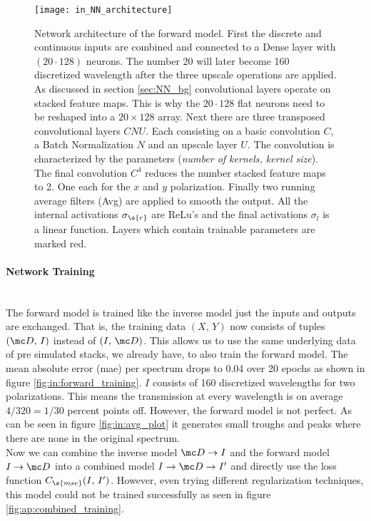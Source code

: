 \begin{figure}[H]
    \centering
    \texttt{[image: in\_NN\_architecture]}
    \caption{Network architecture of the forward model. First the discrete and continuous inputs are combined and connected to a Dense layer with 
    $(20 \cdot 128)$
    neurons. The number 20 will later become 160 discretized wavelength after the three upscale operations are applied. As discussed in section \ref{sec:NN_bg} convolutional layers operate on stacked feature maps. This is why the $20 \cdot 128$ flat neurons need to be reshaped into a $20 \times 128$ array. Next there are three transposed convolutional layers $CNU$. Each consisting on a basic convolution $C$, a Batch Normalization $N$ and an upscale layer $U$. The convolution is characterized by the parameters (\textit{number of kernels, kernel size}). The final convolution $C^4$ reduces the number stacked feature maps to 2. One each for the $x$ and $y$ polarization. Finally two running average filters (Avg) are applied to smooth the output. All the internal activations $\sigma_\s{r}$ are ReLu's and the final activations $\sigma_{l}$ is a linear function.
    Layers which contain trainable parameters are marked red.
    }
    \label{fig:in:NN}
\end{figure}



\newpage
\paragraph{Network Training}~\\
The forward model is trained like the inverse model just the inputs and outputs are exchanged. That is, the training data $(X,\, Y)$ now consists of tuples 
$(\mc D,\, I)$ instead of $(I,\, \mc D)$.
This allows us to use the same underlying data of pre simulated stacks, we already have, to also train the forward model. 
The mean absolute error (mae) per spectrum drops to 0.04 over 20 epochs as shown in figure \ref{fig:in:forward_training}. $I$ consists of 160 discretized wavelengths for two polarizations. This means the transmission at every wavelength is on average $4/320 = 1/30$ percent points off. However, the forward model is not perfect. As can be seen in figure \ref{fig:in:avg_plot} it generates small troughs and peaks where there are none in the original spectrum.
\\

\indent
Now we can combine the inverse model $\mc D \rightarrow I$ and the forward model $I \rightarrow \mc D$ into a combined model $I \rightarrow \mc D \rightarrow I'$ and directly use the loss function $C_\s{mse}(I,\, I')$.
However, even trying different regularization techniques, this model could not be trained successfully as seen in figure \ref{fig:ap:combined_training}.  


